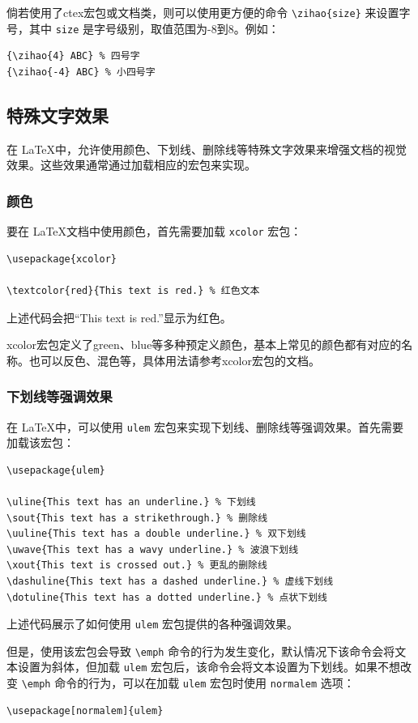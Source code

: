 倘若使用了ctex宏包或文档类，则可以使用更方便的命令 \verb|\zihao{size}| 来设置字号，其中 \verb|size| 是字号级别，取值范围为-8到8。例如：
\begin{verbatim}
{\zihao{4} ABC} % 四号字
{\zihao{-4} ABC} % 小四号字
\end{verbatim}

\subsection{特殊文字效果}

在 \LaTeX 中，允许使用颜色、下划线、删除线等特殊文字效果来增强文档的视觉效果。这些效果通常通过加载相应的宏包来实现。

\subsubsection{颜色}

要在 \LaTeX 文档中使用颜色，首先需要加载 \verb|xcolor| 宏包：
\begin{verbatim}
\usepackage{xcolor}

\textcolor{red}{This text is red.} % 红色文本
\end{verbatim}
上述代码会把“This text is red.”显示为红色。

xcolor宏包定义了green、blue等多种预定义颜色，基本上常见的颜色都有对应的名称。也可以反色、混色等，具体用法请参考xcolor宏包的文档。

\subsubsection{下划线等强调效果}

在 \LaTeX 中，可以使用 \verb|ulem| 宏包来实现下划线、删除线等强调效果。首先需要加载该宏包：
\begin{verbatim}
\usepackage{ulem}

\uline{This text has an underline.} % 下划线
\sout{This text has a strikethrough.} % 删除线
\uuline{This text has a double underline.} % 双下划线
\uwave{This text has a wavy underline.} % 波浪下划线
\xout{This text is crossed out.} % 更乱的删除线
\dashuline{This text has a dashed underline.} % 虚线下划线
\dotuline{This text has a dotted underline.} % 点状下划线
\end{verbatim}
上述代码展示了如何使用 \verb|ulem| 宏包提供的各种强调效果。

但是，使用该宏包会导致 \verb|\emph| 命令的行为发生变化，默认情况下该命令会将文本设置为斜体，但加载 \verb|ulem| 宏包后，该命令会将文本设置为下划线。如果不想改变 \verb|\emph| 命令的行为，可以在加载 \verb|ulem| 宏包时使用 \verb|normalem| 选项：
\begin{verbatim}
\usepackage[normalem]{ulem}
\end{verbatim}

